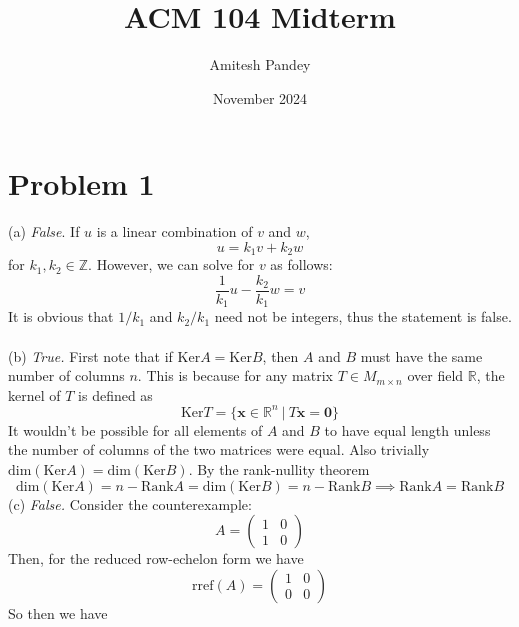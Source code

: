 \documentclass{article}
\title{ACM 104 Midterm}
\author{Amitesh Pandey}
\date{November 2024}
\begin{document}
\maketitle
\section*{Problem 1}
(a) \emph{False}. If $u$ is a linear combination of $v$ and $w$,
\begin{equation*}
    u = k_{1}v + k_{2}w
\end{equation*}
for $k_{1}, k_{2} \in \mathbb{Z}$. However, we can solve for $v$ as follows:
\begin{equation*}
    \frac{1}{k_1}u -\frac{k_2}{k_1}w = v
\end{equation*}
It is obvious that $1/k_1$ and $k_2/k_1$ need not be integers, thus the statement is false.\\\\
(b) \emph{True.} First note that if $\text{Ker} A = \text{Ker} B$, then $A$ and $B$ must have the same number of columns $n$. This is because for any matrix $T \in M_{m\times n}$ over field $\mathbb{R}$, the kernel of $T$ is defined as
\begin{equation*}
    \text{Ker} T = \{\mathbf{x} \in \mathbb{R}^{n} \ | \ T\mathbf{x} = \mathbf{0}\}
\end{equation*}
It wouldn't be possible for all elements of $A$ and $B$ to have equal length unless the number of columns of the two matrices were equal. Also trivially $\text{dim}(\text{Ker}A) = \text{dim}(\text{Ker}B)$. By the rank-nullity theorem
\begin{equation*}
    \text{dim}(\text{Ker}A) = n - \text{Rank} A = \text{dim}(\text{Ker}B) = n - \text{Rank} B \implies \text{Rank} A = \text{Rank}B
\end{equation*}
(c) \emph{False. }Consider the counterexample:
\begin{equation*}
    A = \begin{pmatrix}
        1 & 0\\
        1 & 0
    \end{pmatrix}
\end{equation*}
Then, for the reduced row-echelon form we have
\begin{equation*}
    \text{rref}(A) = \begin{pmatrix}
        1 & 0\\
        0 & 0
    \end{pmatrix}
\end{equation*}
So then we have
\end{document}
